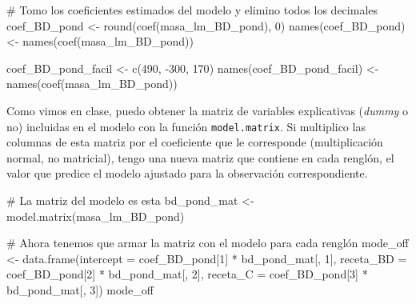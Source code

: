 \documentclass[
  letterpaper,
  DIV=11,
  numbers=noendperiod]{scrartcl}
\newenvironment{Shaded}{\begin{snugshade}}{\end{snugshade}}
\newcommand{\AttributeTok}[1]{\textcolor[rgb]{0.40,0.45,0.13}{#1}}
\newcommand{\CommentTok}[1]{\textcolor[rgb]{0.37,0.37,0.37}{#1}}
\newcommand{\DecValTok}[1]{\textcolor[rgb]{0.68,0.00,0.00}{#1}}
\newcommand{\FunctionTok}[1]{\textcolor[rgb]{0.28,0.35,0.67}{#1}}
\newcommand{\NormalTok}[1]{\textcolor[rgb]{0.00,0.23,0.31}{#1}}
\newcommand{\OtherTok}[1]{\textcolor[rgb]{0.00,0.23,0.31}{#1}}
\newcommand{\SpecialCharTok}[1]{\textcolor[rgb]{0.37,0.37,0.37}{#1}}
\begin{document}
\begin{Shaded}
\begin{Highlighting}[]
\CommentTok{\# Tomo los coeficientes estimados del modelo y elimino todos los decimales}
\NormalTok{coef\_BD\_pond }\OtherTok{\textless{}{-}} \FunctionTok{round}\NormalTok{(}\FunctionTok{coef}\NormalTok{(masa\_lm\_BD\_pond), }\DecValTok{0}\NormalTok{)}
\FunctionTok{names}\NormalTok{(coef\_BD\_pond) }\OtherTok{\textless{}{-}}  \FunctionTok{names}\NormalTok{(}\FunctionTok{coef}\NormalTok{(masa\_lm\_BD\_pond))}

\NormalTok{coef\_BD\_pond\_facil }\OtherTok{\textless{}{-}} \FunctionTok{c}\NormalTok{(}\DecValTok{490}\NormalTok{, }\SpecialCharTok{{-}}\DecValTok{300}\NormalTok{, }\DecValTok{170}\NormalTok{)}
\FunctionTok{names}\NormalTok{(coef\_BD\_pond\_facil) }\OtherTok{\textless{}{-}} \FunctionTok{names}\NormalTok{(}\FunctionTok{coef}\NormalTok{(masa\_lm\_BD\_pond))}
\end{Highlighting}
\end{Shaded}

Como vimos en clase, puedo obtener la matriz de variables explicativas
(\emph{dummy} o no) incluidas en el modelo con la función
\texttt{model.matrix}. Si multiplico las columnas de esta matriz por el
coeficiente que le corresponde (multiplicación normal, no matricial),
tengo una nueva matriz que contiene en cada renglón, el valor que
predice el modelo ajustado para la observación correspondiente.

\begin{Shaded}
\begin{Highlighting}[]
\CommentTok{\# La matriz del modelo es esta}
\NormalTok{bd\_pond\_mat }\OtherTok{\textless{}{-}} \FunctionTok{model.matrix}\NormalTok{(masa\_lm\_BD\_pond)}


\CommentTok{\# Ahora tenemos que armar la matriz con el modelo para cada renglón}
\NormalTok{mode\_off }\OtherTok{\textless{}{-}}  \FunctionTok{data.frame}\NormalTok{(}\AttributeTok{intercept =}\NormalTok{ coef\_BD\_pond[}\DecValTok{1}\NormalTok{] }\SpecialCharTok{*}\NormalTok{ bd\_pond\_mat[, }\DecValTok{1}\NormalTok{],}
                        \AttributeTok{receta\_BD =}\NormalTok{ coef\_BD\_pond[}\DecValTok{2}\NormalTok{] }\SpecialCharTok{*}\NormalTok{ bd\_pond\_mat[, }\DecValTok{2}\NormalTok{],}
                        \AttributeTok{receta\_C  =}\NormalTok{ coef\_BD\_pond[}\DecValTok{3}\NormalTok{] }\SpecialCharTok{*}\NormalTok{ bd\_pond\_mat[, }\DecValTok{3}\NormalTok{])}
\NormalTok{mode\_off}
\end{Highlighting}
\end{Shaded}
\end{document}
